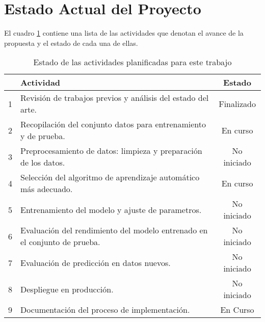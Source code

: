 \section{Estado Actual del Proyecto}

El cuadro \ref{table:4} contiene una lista de las actividades que denotan el avance de la propuesta y el estado de cada
una de ellas.

\begin{center}
    \vspace{-\topsep}
    \begin{table}[h!]
        \begin{tabular}{ |c|l|c| }
            \hline
            & \bf Actividad & \bf Estado \\
            \hline
            1 & Revisión de trabajos previos y análisis del estado del arte. & Finalizado \\
            \hline
            2 & Recopilación del conjunto datos para entrenamiento y de prueba. & En curso \\
            \hline
            3 & Preprocesamiento de datos: limpieza y preparación de los datos. & No iniciado \\
            \hline
            4 & Selección del algoritmo de aprendizaje automático más adecuado. & En curso \\
            \hline
            5 & Entrenamiento del modelo y ajuste de parametros. & No iniciado \\
            \hline
            6 & Evaluación del rendimiento del modelo entrenado en el conjunto de prueba. & No iniciado \\
            \hline
            7 & Evaluación de predicción en datos nuevos. & No iniciado \\
            \hline
            8 & Despliegue en producción. & No iniciado \\
            \hline
            9 & Documentación del proceso de implementación. & En Curso \\
            \hline
        \end{tabular}
        \caption{Estado de las actividades planificadas para este trabajo}
        \label{table:4}
    \end{table}
    \vspace{-\topsep}
\end{center}
